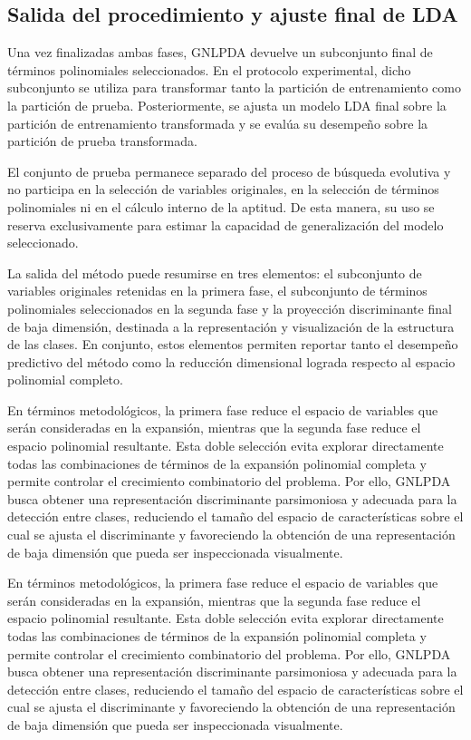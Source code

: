 \subsection{Salida del procedimiento y ajuste final de LDA}

Una vez finalizadas ambas fases, GNLPDA devuelve un subconjunto final de términos
polinomiales seleccionados. En el protocolo experimental, dicho subconjunto se utiliza para transformar tanto la partición de entrenamiento como la partición de prueba. Posteriormente, se ajusta un modelo LDA final sobre la partición de entrenamiento transformada y se evalúa su desempeño sobre la partición de prueba transformada.

El conjunto de prueba permanece separado del proceso de búsqueda evolutiva y no participa en la selección de variables originales, en la selección de términos polinomiales ni en el cálculo interno de la aptitud. De esta manera, su uso se reserva exclusivamente para estimar la capacidad de generalización del modelo seleccionado.

La salida del método puede resumirse en tres elementos: el subconjunto de variables
originales retenidas en la primera fase, el subconjunto de términos polinomiales
seleccionados en la segunda fase y la proyección discriminante final de baja dimensión, destinada a la representación y visualización de la estructura de las clases.
En conjunto, estos elementos permiten reportar tanto el desempeño predictivo del método como la reducción dimensional lograda respecto al espacio polinomial completo.

En términos metodológicos, la primera fase reduce el espacio de variables que serán consideradas en la expansión, mientras que la segunda fase reduce el espacio polinomial resultante. Esta doble selección evita explorar directamente todas las combinaciones de términos de la expansión polinomial completa y permite controlar el crecimiento combinatorio del problema. Por ello, GNLPDA busca obtener una representación discriminante parsimoniosa y adecuada para la detección entre clases, reduciendo el tamaño del espacio de características sobre el cual se ajusta el discriminante y favoreciendo la obtención de una representación de baja dimensión que pueda ser inspeccionada visualmente.

En términos metodológicos, la primera fase reduce el espacio de variables que serán consideradas en la expansión, mientras que la segunda fase reduce el espacio polinomial resultante. Esta doble selección evita explorar directamente todas las combinaciones de términos de la expansión polinomial completa y permite controlar el crecimiento combinatorio del problema. Por ello, GNLPDA busca obtener una representación discriminante parsimoniosa y adecuada para la detección entre clases, reduciendo el tamaño del espacio de características sobre el cual se ajusta el discriminante y favoreciendo la obtención de una representación de baja dimensión que pueda ser inspeccionada visualmente.

